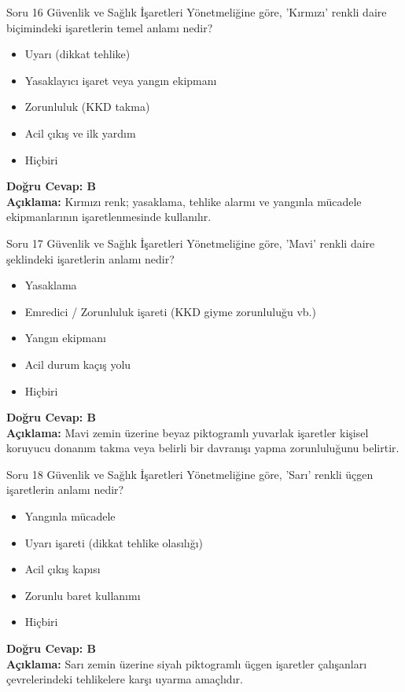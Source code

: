 \documentclass[12pt,a4paper]{article}
\begin{document}
\begin{testcard}{Soru 16}
    Güvenlik ve Sağlık İşaretleri Yönetmeliğine göre, 'Kırmızı' renkli daire biçimindeki işaretlerin temel anlamı nedir?
    \begin{itemize}
        \item[A)] Uyarı (dikkat tehlike)
        \item[B)] Yasaklayıcı işaret veya yangın ekipmanı
        \item[C)] Zorunluluk (KKD takma)
        \item[D)] Acil çıkış ve ilk yardım
        \item[E)] Hiçbiri
    \end{itemize}
    \tcblower
    \textbf{Doğru Cevap: B} \\
    \textbf{Açıklama:} Kırmızı renk; yasaklama, tehlike alarmı ve yangınla mücadele ekipmanlarının işaretlenmesinde kullanılır.
\end{testcard}

\begin{testcard}{Soru 17}
    Güvenlik ve Sağlık İşaretleri Yönetmeliğine göre, 'Mavi' renkli daire şeklindeki işaretlerin anlamı nedir?
    \begin{itemize}
        \item[A)] Yasaklama
        \item[B)] Emredici / Zorunluluk işareti (KKD giyme zorunluluğu vb.)
        \item[C)] Yangın ekipmanı
        \item[D)] Acil durum kaçış yolu
        \item[E)] Hiçbiri
    \end{itemize}
    \tcblower
    \textbf{Doğru Cevap: B} \\
    \textbf{Açıklama:} Mavi zemin üzerine beyaz piktogramlı yuvarlak işaretler kişisel koruyucu donanım takma veya belirli bir davranışı yapma zorunluluğunu belirtir.
\end{testcard}

\begin{testcard}{Soru 18}
    Güvenlik ve Sağlık İşaretleri Yönetmeliğine göre, 'Sarı' renkli üçgen işaretlerin anlamı nedir?
    \begin{itemize}
        \item[A)] Yangınla mücadele
        \item[B)] Uyarı işareti (dikkat tehlike olasılığı)
        \item[C)] Acil çıkış kapısı
        \item[D)] Zorunlu baret kullanımı
        \item[E)] Hiçbiri
    \end{itemize}
    \tcblower
    \textbf{Doğru Cevap: B} \\
    \textbf{Açıklama:} Sarı zemin üzerine siyah piktogramlı üçgen işaretler çalışanları çevrelerindeki tehlikelere karşı uyarma amaçlıdır.
\end{testcard}
\end{document}
